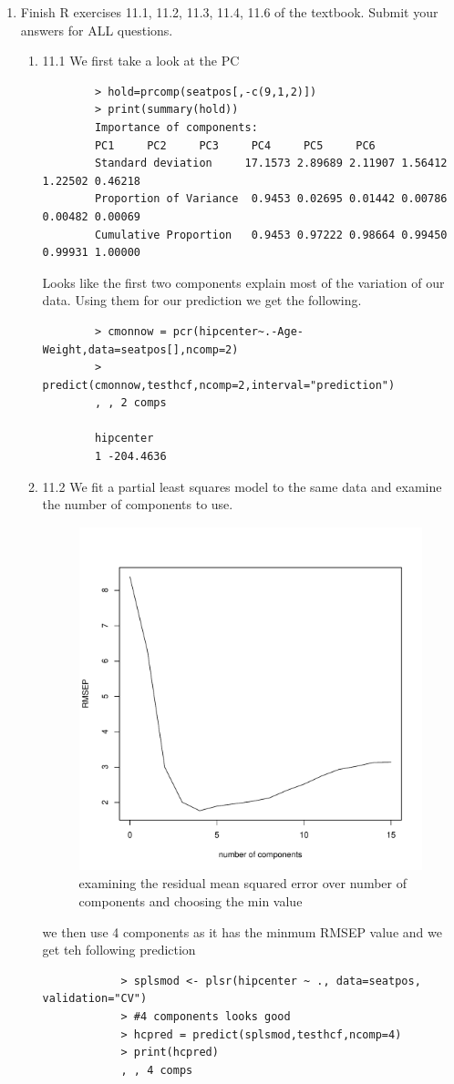 \documentclass[11pt]{article}
\begin{document}
\begin{enumerate}
\item  Finish R exercises 11.1, 11.2, 11.3, 11.4, 11.6 of the textbook. Submit your answers for {\color{red}ALL} questions.
\begin{enumerate}
	\item 11.1
	We first take a look at the PC
	\begin{verbatim}
		> hold=prcomp(seatpos[,-c(9,1,2)])
		> print(summary(hold))
		Importance of components:
		PC1     PC2     PC3     PC4     PC5     PC6
		Standard deviation     17.1573 2.89689 2.11907 1.56412 1.22502 0.46218
		Proportion of Variance  0.9453 0.02695 0.01442 0.00786 0.00482 0.00069
		Cumulative Proportion   0.9453 0.97222 0.98664 0.99450 0.99931 1.00000
	\end{verbatim}
	Looks like the first two components explain most of the variation of our data.
	Using them for our prediction we get the following.
	\begin{verbatim}
		> cmonnow = pcr(hipcenter~.-Age-Weight,data=seatpos[],ncomp=2)
		> predict(cmonnow,testhcf,ncomp=2,interval="prediction")
		, , 2 comps
		
		hipcenter
		1 -204.4636
	\end{verbatim}
	\item 11.2
	We fit a partial least squares model to the same data and examine the number of components to use.
		\begin{figure}[H]
			\centering
			\includegraphics[width=10cm,height=10cm]{112numc.pdf}
			\caption[paic]{examining the residual mean squared error over number of components and choosing the min value}
			\label{cspos}
		\end{figure}
		we then use 4 components as it has the minmum RMSEP value and we get teh following prediction
		\begin{verbatim}
			> splsmod <- plsr(hipcenter ~ ., data=seatpos, validation="CV")
			> #4 components looks good
			> hcpred = predict(splsmod,testhcf,ncomp=4)
			> print(hcpred)
			, , 4 comps
			

\end{verbatim}
\end{enumerate}
\end{enumerate}
\end{document}
